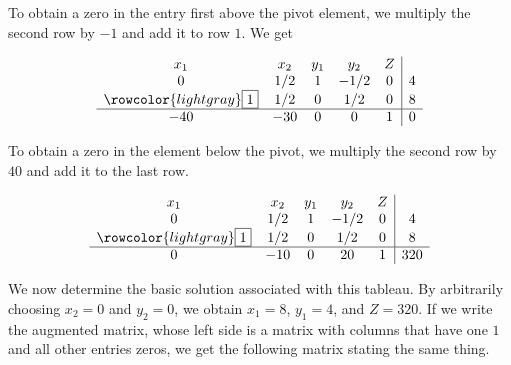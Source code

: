 \begin{solution}
\begin{enumerate}
              To obtain a zero in the entry first above the pivot element, we multiply the second row by \(-1\) and add it to row \(1\). We get

              \[
                  \begin{array}{ccccc|c}
                      x_1                           & x_2 & y_1 & y_2  & Z &   \\
                      0                             & 1/2 & 1   & -1/2 & 0 & 4 \\
                      \rowcolor{lightgray} \fbox{1} & 1/2 & 0   & 1/2  & 0 & 8 \\
                      \hline
                      -40                           & -30 & 0   & 0    & 1 & 0 \\
                  \end{array}
              \]

              To obtain a zero in the element below the pivot, we multiply the second row by \(40\) and add it to the last row.

              \[
                  \begin{array}{ccccc|c}
                      x_1                           & x_2 & y_1 & y_2  & Z &     \\
                      0                             & 1/2 & 1   & -1/2 & 0 & 4   \\
                      \rowcolor{lightgray} \fbox{1} & 1/2 & 0   & 1/2  & 0 & 8   \\
                      \hline
                      0                             & -10 & 0   & 20   & 1 & 320 \\
                  \end{array}
              \]


              We now determine the basic solution associated with this tableau. By arbitrarily choosing \( x_2 = 0 \) and \( y_2 = 0 \), we obtain \( x_1 = 8 \), \( y_1 = 4 \), and \( Z = 320 \). If we write the augmented matrix, whose left side is a matrix with columns that have one \(1\) and all other entries zeros, we get the following matrix stating the same thing.




\end{enumerate}
\end{solution}
